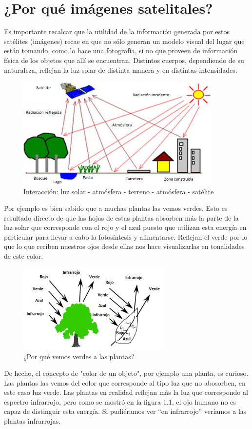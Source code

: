 \documentclass[11pt,spanish]{article}
\begin{document}
\newpage
\section{¿Por qué imágenes satelitales?}

Es importante recalcar que la utilidad de la información generada por estos satélites (imágenes) recae en que no sólo generan un modelo visual del lugar que están tomando, como lo hace una fotografía, si no que proveen de información física de los objetos que allí se encuentran. Distintos cuerpos, dependiendo de su naturaleza, reflejan la luz solar de distinta manera y en distintas intensidades.

\begin{figure}[h!]
	\centering
		\includegraphics[width=4in]{../Figuras_y_logos/3_sol_satelites.png}
	\caption{Interacción: luz solar - atmósfera - terreno - atmósfera - satélite}
	\label{fig:3_sol_satelites}
\end{figure}

Por ejemplo es bien sabido que a muchas plantas las vemos verdes. Esto es resultado directo de que las hojas de estas plantas absorben más la parte de la luz solar que corresponde con el rojo y el azul puesto que utilizan esta energía en particular para llevar a cabo la fotosíntesis y alimentarse. Reflejan el verde por lo que lo que reciben nuestros ojos desde ellas nos hace visualizarlas en tonalidades de este color.

\begin{figure}[h!]
	\centering
		\includegraphics[width=3in]{../Figuras_y_logos/4_plantas.png}
	\caption{¿Por qué vemos verdes a las plantas?}
	\label{fig:4_plantas}
\end{figure}

\newpage

De hecho, el concepto de "color de un objeto", por ejemplo una planta, es curioso.  Las plantas las vemos del color que corresponde al tipo luz que no abosorben, en este caso luz verde. Las plantas en realidad reflejan más la luz que correspondo al espectro infrarrojo, pero como se mostró en la figura 1.1, el ojo humano no es capaz de distinguir esta energía. Si pudiéramos ver "`en infrarrojo"' veríamos a las plantas infrarrojas. 
\end{document}
